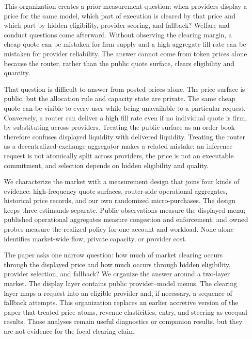 \documentclass[11pt]{article}
\newcommand{\1}{\mathbf{1}}
\begin{document}
This organization creates a prior measurement question: when providers display a
price for the same model, which part of execution is cleared by that price and
which part by hidden eligibility, provider scoring, and fallback?  Welfare and
conduct questions come afterward.  Without observing the clearing margin, a
cheap quote can be mistaken for firm supply and a high aggregate fill rate can be
mistaken for provider reliability.  The answer cannot come from token prices
alone because the router, rather than the public quote surface, clears eligibility
and quantity.

That question is difficult to answer from posted prices alone.  The price surface
is public, but the allocation rule and capacity state are private.  The same cheap
quote can be visible to every user while being unavailable to a particular request.
Conversely, a router can deliver a high fill rate even if no individual quote is
firm, by substituting across providers.  Treating the public surface as an order
book therefore confuses displayed liquidity with delivered liquidity.  Treating
the router as a decentralized-exchange aggregator makes a related mistake: an
inference request is not atomically split across providers, the price is not an
executable commitment, and selection depends on hidden eligibility and quality.

We characterize the market with a measurement design that joins four kinds of
evidence: high-frequency quote surfaces, router-side operational aggregates,
historical price records, and our own randomized micro-purchases.  The design
keeps three estimands separate.  Public observations measure the displayed menu;
published operational aggregates measure congestion and enforcement; and owned
probes measure the realized policy for one account and workload.  None alone
identifies market-wide flow, private capacity, or provider cost.

The paper asks one narrow question: how much of market clearing occurs through
the displayed price and how much occurs through hidden eligibility, provider
selection, and fallback?  We organize the answer around a two-layer market.  The
display layer contains public provider--model menus.  The clearing layer maps a
request into an eligible provider and, if necessary, a sequence of fallback
attempts.  This organization replaces an earlier accretive version of the paper
that treated price atoms, revenue elasticities, entry, and steering as coequal
results.  Those analyses remain useful diagnostics or companion results, but
they are not evidence for the focal clearing claim.
\end{document}
